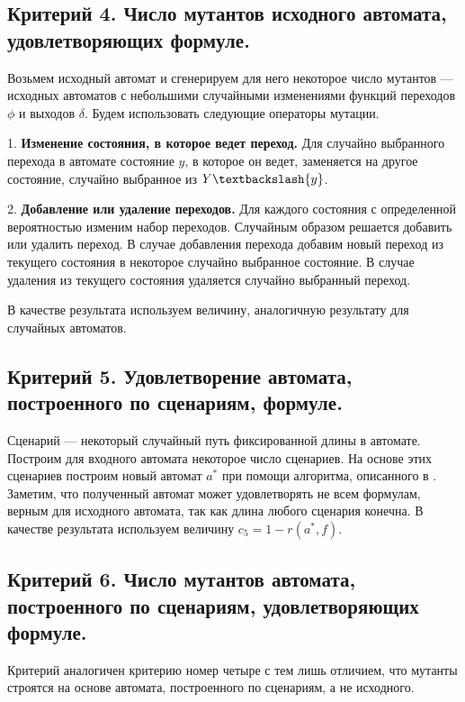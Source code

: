 \documentclass[12pt,fleqn]{article}
\begin{document}
\subsection{Критерий 4. Число мутантов исходного автомата, удовлетворяющих формуле.}

Возьмем исходный автомат и сгенерируем для него некоторое число мутантов --- исходных автоматов с небольшими
случайными изменениями функций переходов $\phi$ и выходов $\delta$. Будем использовать следующие операторы мутации.

1. \textbf{Изменение состояния, в которое ведет переход.} Для случайно выбранного перехода в автомате состояние $y$,
в которое он ведет, заменяется на другое состояние, случайно выбранное из $Y \textbackslash \{y\}$. 

2. \textbf{Добавление или удаление переходов.} Для каждого состояния с определенной вероятностью изменим набор переходов.
Случайным образом решается добавить или удалить переход. В случае добавления перехода добавим новый переход из
текущего состояния в некоторое случайно выбранное состояние. В случае удаления из текущего состояния удаляется
случайно выбранный переход.

В качестве результата используем величину, аналогичную результату для случайных автоматов.

\subsection{Критерий 5. Удовлетворение автомата, построенного по сценариям, формуле.}

Сценарий --- некоторый случайный путь фиксированной длины в автомате. Построим для входного автомата некоторое
число сценариев. На основе этих сценариев построим новый автомат $a^*$ при помощи алгоритма, описанного в \cite{eg}.
Заметим, что полученный автомат может удовлетворять не всем формулам, верным для исходного автомата, так как
длина любого сценария конечна. В качестве результата используем величину $c_5 = 1 - r(a^*, f)$.

\subsection{Критерий 6. Число мутантов автомата, построенного по сценариям, удовлетворяющих формуле.}

Критерий аналогичен критерию номер четыре с тем лишь отличием, что мутанты строятся на основе автомата, построенного по
сценариям, а не исходного.
\end{document}
